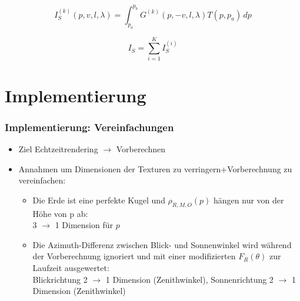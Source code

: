 \documentclass[german]{beamer}
\begin{document}
\begin{frame}
\begin{figure}
	\label{MS-image}
\end{figure}

\begin{equation*}
	I_S^{(k)}(p,v,l,\lambda) = \int_{p_a}^{p_b} G^{(k)}(p,-v, l, \lambda) T(p,p_a) \,dp
\end{equation*}

\begin{equation*}
	I_S = \sum^{K}_{i=1} I_S^{(i)}
\end{equation*}
\end{frame}

\section{Implementierung}

\begin{frame}
\frametitle{Implementierung: Vereinfachungen}

\begin{itemize}
	\item Ziel Echtzeitrendering $\rightarrow$ Vorberechnen
	\item Annahmen um Dimensionen der Texturen zu verringern+Vorberechnung zu vereinfachen:
		\begin{itemize}
			\item Die Erde ist eine perfekte Kugel und $\rho_{R,M,O}(p)$ hängen nur von der Höhe von p ab:\\ 3
			$\rightarrow$ 1 Dimension für $p$
			\item Die Azimuth-Differenz zwischen Blick- und Sonnenwinkel wird während der Vorberechnung ignoriert und
			mit einer modifizierten $F_R(\theta)$ zur Laufzeit ausgewertet:\\ Blickrichtung 2 $\rightarrow$ 1 Dimension
			(Zenithwinkel), Sonnenrichtung 2 $\rightarrow$ 1 Dimension (Zenithwinkel)
		\end{itemize}
\end{itemize}
\end{frame}
\end{document}
